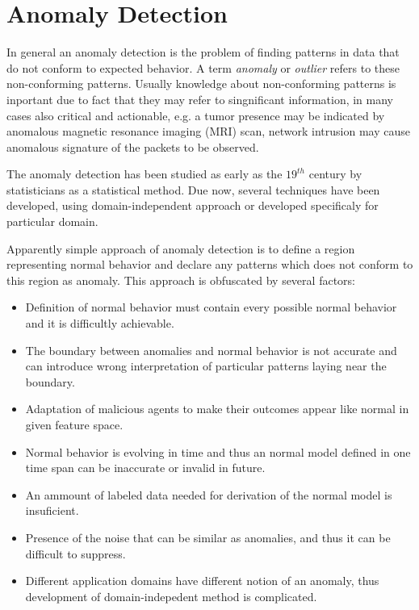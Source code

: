 
\chapter{Anomaly Detection}

In general an anomaly detection is the problem of finding patterns in data that do not 
conform to expected behavior.
A term \emph{anomaly} or \emph{outlier} refers to these non-conforming patterns. 
Usually knowledge about non-conforming patterns is inportant due to fact that they may refer
to singnificant information, in many cases also critical and actionable, 
e.g. a tumor presence may be indicated by anomalous magnetic resonance imaging (MRI) scan, 
network intrusion may cause anomalous signature of the packets to be observed.

The anomaly detection has been studied as early as the $19^{th}$ century by 
statisticians as a statistical method.
Due now, several techniques have been developed, using domain-independent approach 
or developed specificaly for particular domain. %

Apparently simple approach of anomaly detection is to define a region representing 
normal behavior and declare any patterns which does not conform to this region as anomaly. 
This approach is obfuscated by several factors:
\begin{itemize}
	\item Definition of normal behavior must contain every possible normal behavior 
	and it is difficultly achievable.
	\item The boundary between anomalies and normal behavior is not accurate and 
	can introduce wrong interpretation	of particular patterns laying near the boundary.
	\item Adaptation of malicious agents to make their outcomes appear like normal in 
	given feature space.
	\item Normal behavior is evolving in time and thus an normal model defined in one time span 
	can be inaccurate or invalid in future.
	\item An ammount of labeled data needed for derivation of the normal model is insuficient.
	\item Presence of the noise that can  be similar as anomalies, and thus it 
	can be difficult to suppress. 
	\item Different application domains have different notion of an anomaly, 
	thus development of domain-indepedent method is complicated.
\end{itemize}

